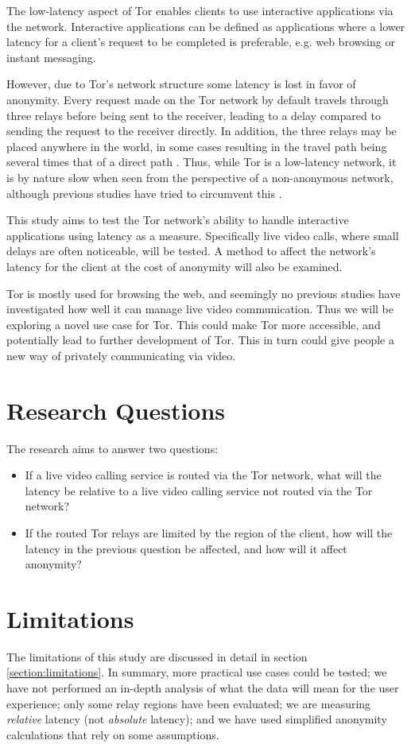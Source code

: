 \documentclass{kththesis}
\begin{document}
The low-latency aspect of Tor enables clients to use interactive applications via the network. Interactive applications can be defined as applications where a lower latency for a client's request to be completed is preferable, e.g. web browsing or instant messaging.

However, due to Tor's network structure some latency is lost in favor of anonymity. Every request made on the Tor network by default travels through three relays before being sent to the receiver, leading to a delay compared to sending the request to the receiver directly. In addition, the three relays may be placed anywhere in the world, in some cases resulting in the travel path being several times that of a direct path \parencite{TorRelaysByCountry}. Thus, while Tor is a low-latency network, it is by nature slow when seen from the perspective of a non-anonymous network, although previous studies have tried to circumvent this \parencite{CLAPS}. 

This study aims to test the Tor network's ability to handle interactive applications using latency as a measure. Specifically live video calls, where small delays are often noticeable, will be tested. A method to affect the network's latency for the client at the cost of anonymity will also be examined.

Tor is mostly used for browsing the web, and seemingly no previous studies have investigated how well it can manage live video communication. Thus we will be exploring a novel use case for Tor. This could make Tor more accessible, and potentially lead to further development of Tor. This in turn could give people a new way of privately communicating via video.

\section{Research Questions}
The research aims to answer two questions:
\begin{itemize}
    \item If a live video calling service is routed via the Tor network, what will the latency be relative to a live video calling service not routed via the Tor network?
    \item If the routed Tor relays are limited by the region of the client, how will the latency in the previous question be affected, and how will it affect anonymity?
\end{itemize}

\section{Limitations}
The limitations of this study are discussed in detail in section \ref{section:limitations}. In summary, more practical use cases could be tested; we have not performed an in-depth analysis of what the data will mean for the user experience; only some relay regions have been evaluated; we are measuring \emph{relative} latency (not \emph{absolute} latency); and we have used simplified anonymity calculations that rely on some assumptions.
\end{document}
